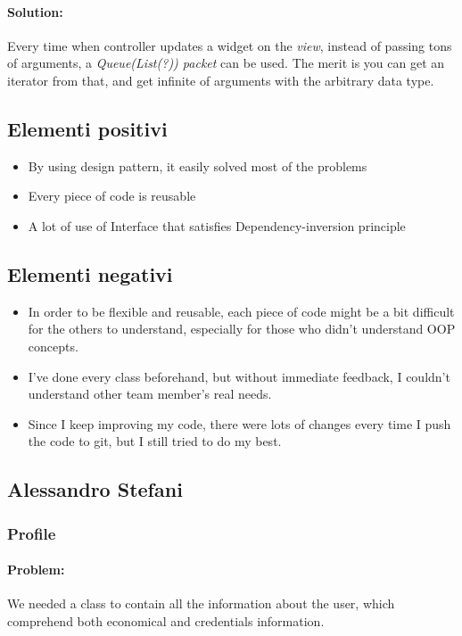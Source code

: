 \documentclass[a4paper,12pt]{report}
\begin{document}
    \paragraph*{Solution:} Every time when controller updates a widget on the \textit{\textit{view}}, instead of passing tons of arguments, a \textit{Queue(List(?)) packet} can be used. The merit is you can get an iterator from that, and get infinite of arguments with the arbitrary data type. 

    \subsection*{Elementi positivi}

    \begin{itemize}
        \item  By using design pattern, it easily solved most of the problems
        \item Every piece of code is reusable 
        \item A lot of use of Interface that satisfies Dependency-inversion principle
    \end{itemize}
    
    \subsection*{Elementi negativi}
    \begin{itemize}
        \item In order to be flexible and reusable, each piece of code might be a bit difficult for the others to understand, especially for those who didn't understand OOP concepts.
        \item I've done every class beforehand, but without immediate feedback, I couldn't understand other team member's real needs. 
        \item Since I keep improving my code, there were lots of changes every time I push the code to git, but I still tried to do my best.
    \end{itemize}
    
\subsection{Alessandro Stefani}

    \subsubsection{Profile}
        \paragraph{Problem:}We needed a class to contain all the information about the user, which comprehend both economical and credentials information.
\end{document}
